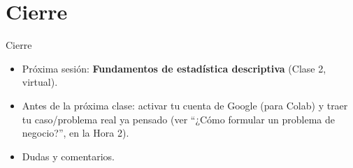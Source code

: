 \documentclass[aspectratio=169,11pt]{beamer}
\begin{document}
\section{Cierre}
\begin{frame}{Cierre}
  \begin{itemize}
    \item Próxima sesión: \textbf{Fundamentos de estadística descriptiva} (Clase 2, virtual).
    \item Antes de la próxima clase: activar tu cuenta de Google (para
      Colab) y traer tu caso/problema real ya pensado (ver ``¿Cómo
      formular un problema de negocio?'', en la Hora 2).
    \item Dudas y comentarios.
  \end{itemize}
\end{frame}

{
\begin{frame}[plain]
\end{frame}
}
\end{document}
